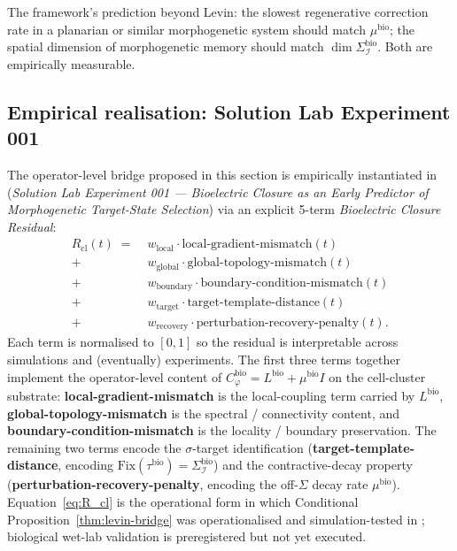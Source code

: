 \documentclass[11pt]{article}
\theoremstyle{plain}
\theoremstyle{definition}
\theoremstyle{remark}
\newcommand{\Fix}{\mathrm{Fix}}
\newcommand{\Ical}{\mathcal{I}}
\newcommand{\Cph}{C_\varphi}
\begin{document}
The framework's prediction beyond Levin: the slowest regenerative correction rate in a planarian or similar morphogenetic system should match $\mu^{\mathrm{bio}}$; the spatial dimension of morphogenetic memory should match $\dim \Sigma_\Ical^{\mathrm{bio}}$. Both are empirically measurable.

\subsection{Empirical realisation: Solution Lab Experiment 001}\label{sec:levin-solution-lab}

The operator-level bridge proposed in this section is empirically instantiated in \citet{SolutionLab001} (\emph{Solution Lab Experiment 001 --- Bioelectric Closure as an Early Predictor of Morphogenetic Target-State Selection}) via an explicit 5-term \emph{Bioelectric Closure Residual}:
\begin{equation}\label{eq:R_cl}
\begin{aligned}
R_{\mathrm{cl}}(t) \;=\;
& w_{\mathrm{local}}    \cdot \text{local-gradient-mismatch}(t) \\
+ \;& w_{\mathrm{global}}   \cdot \text{global-topology-mismatch}(t) \\
+ \;& w_{\mathrm{boundary}} \cdot \text{boundary-condition-mismatch}(t) \\
+ \;& w_{\mathrm{target}}   \cdot \text{target-template-distance}(t) \\
+ \;& w_{\mathrm{recovery}} \cdot \text{perturbation-recovery-penalty}(t).
\end{aligned}
\end{equation}
Each term is normalised to $[0, 1]$ so the residual is interpretable across simulations and (eventually) experiments. The first three terms together implement the operator-level content of $\Cph^{\mathrm{bio}} = L^{\mathrm{bio}} + \mu^{\mathrm{bio}} I$ on the cell-cluster substrate: \textbf{local-gradient-mismatch} is the local-coupling term carried by $L^{\mathrm{bio}}$, \textbf{global-topology-mismatch} is the spectral / connectivity content, and \textbf{boundary-condition-mismatch} is the locality / boundary preservation. The remaining two terms encode the $\sigma$-target identification (\textbf{target-template-distance}, encoding $\Fix(\tau^{\mathrm{bio}}) = \Sigma_\Ical^{\mathrm{bio}}$) and the contractive-decay property (\textbf{perturbation-recovery-penalty}, encoding the off-$\Sigma$ decay rate $\mu^{\mathrm{bio}}$). Equation~\eqref{eq:R_cl} is the operational form in which Conditional Proposition~\ref{thm:levin-bridge} was operationalised and simulation-tested in \citet{SolutionLab001}; biological wet-lab validation is preregistered but not yet executed.
\end{document}
